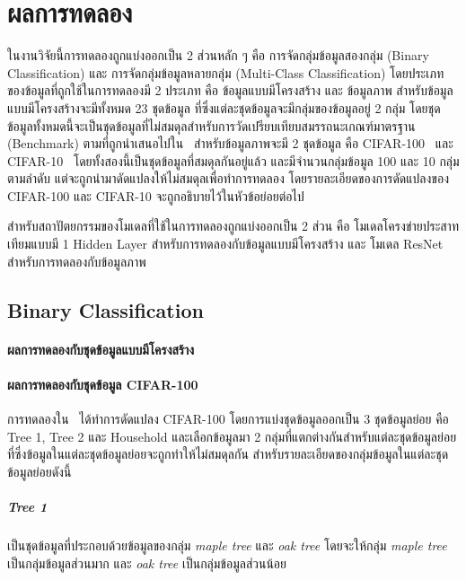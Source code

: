 \chapter{ผลการทดลอง}
\label{chapter:result}

ในงานวิจัยนี้การทดลองถูกแบ่งออกเป็น 2 ส่วนหลัก ๆ คือ การจัดกลุ่มข้อมูลสองกลุ่ม (Binary Classification) และ การจัดกลุ่มข้อมูลหลายกลุ่ม (Multi-Class Classification) โดยประเภทของข้อมูลที่ถูกใช้ในการทดลองมี 2 ประเภท คือ ข้อมูลแบบมีโครงสร้าง และ ข้อมูลภาพ สำหรับข้อมูลแบบมีโครงสร้างจะมีทั้งหมด 23 ชุดข้อมูล ที่ซึ่งแต่ละชุดข้อมูลจะมีกลุ่มของข้อมูลอยู่ 2 กลุ่ม โดยชุดข้อมูลทั้งหมดนี้จะเป็นชุดข้อมูลที่ไม่สมดุลสำหรับการวัดเปรียบเทียบสมรรถนะเกณฑ์มาตรฐาน (Benchmark) ตามที่ถูกนำเสนอไปใน~\cite{Ding:2011} สำหรับข้อมูลภาพจะมี 2 ชุดข้อมูล คือ CIFAR-100~\cite{Krizhevsky:2009} และ CIFAR-10~\cite{Krizhevsky:2009} โดยทั้งสองนี้เป็นชุดข้อมูลที่สมดุลกันอยู่แล้ว และมีจำนวนกลุ่มข้อมูล 100 และ 10 กลุ่มตามลำดับ แต่จะถูกนำมาดัดแปลงให้ไม่สมดุลเพื่อทำการทดลอง โดยรายละเอียดของการดัดแปลงของ CIFAR-100 และ CIFAR-10 จะถูกอธิบายไว้ในหัวข้อย่อยต่อไป

สำหรับสถาปัตยกรรมของโมเดลที่ใช้ในการทดลองถูกแบ่งออกเป็น 2 ส่วน คือ โมเดลโครงข่ายประสาทเทียมแบบมี 1 Hidden Layer สำหรับการทดลองกับข้อมูลแบบมีโครงสร้าง และ โมเดล ResNet~\citep{He:2016} สำหรับการทดลองกับข้อมูลภาพ

\section{Binary Classification}
\subsubsection{ผลการทดลองกับชุดข้อมูลแบบมีโครงสร้าง}
\subsubsection{ผลการทดลองกับชุดข้อมูล CIFAR-100}
การทดลองใน~\cite{Wang:2016} ได้ทำการดัดแปลง CIFAR-100 โดยการแบ่งชุดข้อมูลออกเป็น 3 ชุดข้อมูลย่อย คือ Tree 1, Tree 2 และ Household และเลือกข้อมูลมา 2 กลุ่มที่แตกต่างกันสำหรับแต่ละชุดข้อมูลย่อย ที่ซึ่งข้อมูลในแต่ละชุดข้อมูลย่อยจะถูกทำให้ไม่สมดุลกัน สำหรับรายละเอียดของกลุ่มข้อมูลในแต่ละชุดข้อมูลย่อยดังนี้

\paragraph{Tree 1}
เป็นชุดข้อมูลที่ประกอบด้วยข้อมูลของกลุ่ม \emph{maple tree} และ \emph{oak tree} โดยจะให้กลุ่ม \emph{maple tree} เป็นกลุ่มข้อมูลส่วนมาก และ \emph{oak tree} เป็นกลุ่มข้อมูลส่วนน้อย

